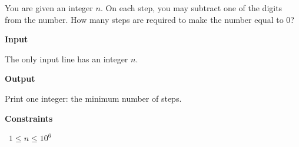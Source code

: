 You are given an integer $n$. On each step, you may subtract one of the digits from the number.
How many steps are required to make the number equal to $0$?

\vspace{0.3cm}\noindent\textbf{Input}

The only input line has an integer $n$.

\vspace{0.3cm}\noindent\textbf{Output}

Print one integer: the minimum number of steps.

\vspace{0.3cm}\noindent\textbf{Constraints}

\textbullet\ $1 \le n \le 10^6$